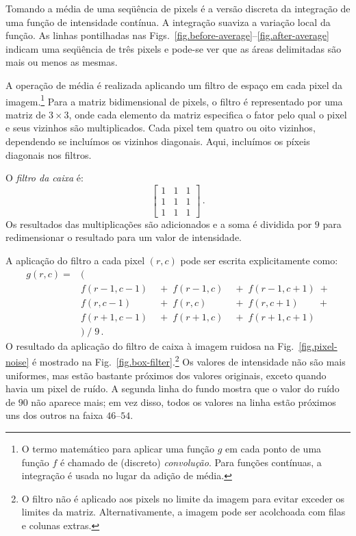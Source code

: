 Tomando a média de uma seqüência de pixels é a versão discreta da integração de uma função de intensidade contínua. A integração suaviza a variação local da função. As linhas pontilhadas nas Figs.~\ref{fig.before-average}--\ref{fig.after-average} indicam uma seqüência de três pixels e pode-se ver que as áreas delimitadas são mais ou menos as mesmas.

A operação de média é realizada aplicando um filtro de espaço em cada pixel da imagem.\footnote{O termo matemático para aplicar uma função $g$ em cada ponto de uma função $f$ é chamado de (discreto) \emph{convolução}. Para funções contínuas, a integração é usada no lugar da adição de média.} Para a matriz bidimensional de pixels, o filtro é representado por uma matriz de $3\times 3$, onde cada elemento da matriz especifica o fator pelo qual o pixel e seus vizinhos são multiplicados. Cada pixel tem quatro ou oito vizinhos, dependendo se incluímos os vizinhos diagonais. Aqui, incluímos os píxeis diagonais nos filtros.

O \emph{filtro da caixa} é:
\[
\left[
\begin{array}{ccc}
1 & 1 & 1\\
1 & 1 & 1\\
1 & 1 & 1
\end{array}
\right]\,.
\]
Os resultados das multiplicações são adicionados e a soma é dividida por $9$ para redimensionar o resultado para um valor de intensidade.

A aplicação do filtro a cada pixel $(r,c)$ pode ser escrita explicitamente como:
\[
\begin{array}{llll}
g(r,c) = &(\\
&f(r-1,c-1) & \;+\; f(r-1,c) & \;+\; f(r-1,c+1) \;+\\
&f(r,c-1) & \;+\; f(r,c) & \;+\; f(r,c+1) \;\;\;\;\;\;\;+\\
&f(r+1,c-1) & \;+\; f(r+1,c) & \;+\; f(r+1,c+1)\\
& ) \; / \; 9\,.
\end{array}
\]
O resultado da aplicação do filtro de caixa à imagem ruidosa na Fig.~\ref{fig.pixel-noise} é mostrado na Fig.~\ref{fig.box-filter}.\footnote{O filtro não é aplicado aos pixels no limite da imagem para evitar exceder os limites da matriz. Alternativamente, a imagem pode ser acolchoada com filas e colunas extras.} Os valores de intensidade não são mais uniformes, mas estão bastante próximos dos valores originais, exceto quando havia um pixel de ruído. A segunda linha do fundo mostra que o valor do ruído de $90$ não aparece mais; em vez disso, todos os valores na linha estão próximos uns dos outros na faixa $46$--$54$.

